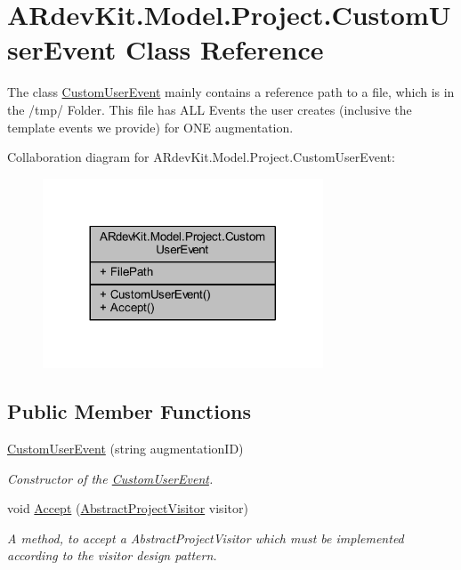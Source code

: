 \hypertarget{class_a_rdev_kit_1_1_model_1_1_project_1_1_custom_user_event}{\section{A\-Rdev\-Kit.\-Model.\-Project.\-Custom\-User\-Event Class Reference}
\label{class_a_rdev_kit_1_1_model_1_1_project_1_1_custom_user_event}
}


The class \hyperlink{class_a_rdev_kit_1_1_model_1_1_project_1_1_custom_user_event}{Custom\-User\-Event} mainly contains a reference path to a file, which is in the /tmp/ Folder. This file has A\-L\-L Events the user creates (inclusive the template events we provide) for O\-N\-E augmentation.  




Collaboration diagram for A\-Rdev\-Kit.\-Model.\-Project.\-Custom\-User\-Event\-:
\nopagebreak
\begin{figure}[H]
\begin{center}
\leavevmode
\includegraphics[width=236pt]{class_a_rdev_kit_1_1_model_1_1_project_1_1_custom_user_event__coll__graph}
\end{center}
\end{figure}
\subsection*{Public Member Functions}
\begin{DoxyCompactItemize}
\item 
\hyperlink{class_a_rdev_kit_1_1_model_1_1_project_1_1_custom_user_event_a57e6abd6b60a1b156cc6f025b5ba8e0e}{Custom\-User\-Event} (string augmentation\-I\-D)
\begin{DoxyCompactList}\small\item\em Constructor of the \hyperlink{class_a_rdev_kit_1_1_model_1_1_project_1_1_custom_user_event}{Custom\-User\-Event}. \end{DoxyCompactList}\item 
void \hyperlink{class_a_rdev_kit_1_1_model_1_1_project_1_1_custom_user_event_aa652f9348729297a9749aafa5a3efefb}{Accept} (\hyperlink{class_a_rdev_kit_1_1_controller_1_1_project_controller_1_1_abstract_project_visitor}{Abstract\-Project\-Visitor} visitor)
\begin{DoxyCompactList}\small\item\em A method, to accept a Abstract\-Project\-Visitor which must be implemented according to the visitor design pattern. \end{DoxyCompactList}\end{DoxyCompactItemize}
